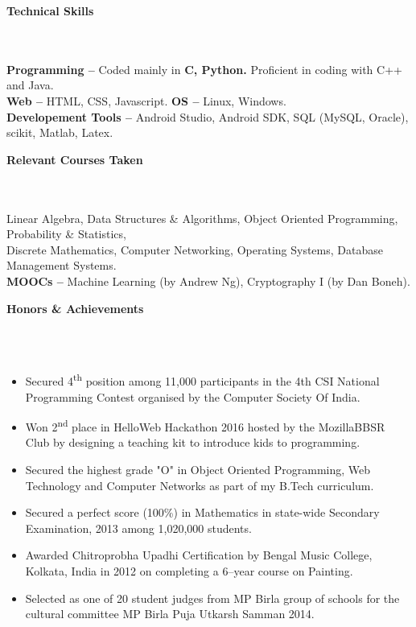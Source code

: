 \documentclass[a4paper,10pt]{article}
\newcommand{\lsep}{-0.5cm}
\newcommand{\resheading}[1]{{\large \colorbox{mygrey}{\begin{minipage}{0.99\textwidth}{\textbf{#1 \vphantom{p\^{E}}}}\end{minipage}}}}
\begin{document}
\resheading{\textbf{Technical Skills} }\\\\[\lsep]

\indent\textbf{Programming -- }Coded mainly in \textbf{C, Python.} Proficient in coding with C++ and Java.\\
\indent\textbf{Web -- } HTML, CSS, Javascript. \indent\indent\textbf{OS -- } Linux, Windows.\\
\indent\textbf{Developement Tools --} Android Studio, Android SDK, SQL (MySQL, Oracle), scikit, Matlab, Latex.\\


\resheading{\textbf{Relevant Courses Taken} }\\\\[\lsep]

\indent Linear Algebra, Data Structures \& Algorithms, Object Oriented Programming, Probability \& Statistics,\\
\indent Discrete Mathematics, Computer Networking, Operating Systems, Database Management Systems.\\
\indent\textbf{MOOCs -- }Machine Learning (by Andrew Ng), Cryptography I (by Dan Boneh).\\


\resheading{\textbf{Honors \& Achievements}}\\[\lsep]\\[-0.2cm]

\begin{itemize}
\item {Secured 4\textsuperscript{th} position among 11,000 participants in the 4th CSI National Programming Contest organised by the Computer Society Of India.}
\item {Won 2\textsuperscript{nd} place in HelloWeb Hackathon 2016 hosted by the MozillaBBSR Club by designing a teaching kit to introduce kids to programming.}
\item {Secured the highest grade "O" in Object Oriented Programming, Web Technology and Computer Networks as part of my B.Tech curriculum. }
\item {Secured a perfect score (100\%) in Mathematics in state-wide Secondary Examination, 2013 among 1,020,000 students.}
\item {Awarded Chitroprobha Upadhi Certification by Bengal Music College, Kolkata, India in 2012 on completing a 6--year course on Painting.}
\item{Selected as one of 20 student judges from MP Birla group of schools for the cultural committee MP Birla Puja Utkarsh Samman 2014.}
\end{itemize}
\end{document}
